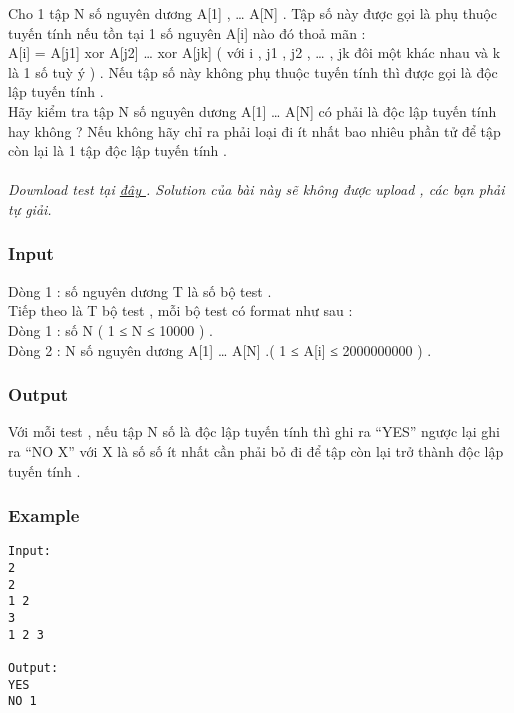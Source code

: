 



   Cho 1 tập N số nguyên dương A[1] , … A[N] . Tập số này được gọi là phụ thuộc tuyến tính nếu tồn tại 1 số nguyên A[i] nào đó thoả mãn :   
\\   A[i] = A[j1] xor A[j2] … xor A[jk] ( với i , j1 , j2 , … , jk  đôi một khác nhau và k là 1 số tuỳ ý ) . Nếu tập số này không phụ thuộc tuyến tính thì được gọi là độc lập tuyến tính .   
\\   Hãy kiểm tra tập N số nguyên dương A[1] … A[N] có phải là độc lập tuyến tính hay không ? Nếu không hãy chỉ ra phải loại đi ít nhất bao nhiêu phần tử để tập còn lại là 1 tập độc lập tuyến tính .   
\\
\\\textit{    Download test tại    \href{http://vn.spoj.pl/content/XOR.rar}{     đây    }    . Solution của bài này sẽ không được upload , các bạn phải tự giải.   }

\subsubsection{   Input  }

   Dòng 1 : số nguyên dương T là số bộ test .   
\\   Tiếp theo là T bộ test , mỗi bộ test có format như sau :   
\\   Dòng 1 : số N ( 1 ≤ N ≤ 10000 ) .   
\\   Dòng 2 : N số nguyên dương A[1] … A[N] .( 1 ≤ A[i] ≤ 2000000000 ) .   
\\

\subsubsection{   Output  }

   Với mỗi test , nếu tập N số là độc lập tuyến tính thì ghi ra “YES” ngược lại ghi ra “NO X” với X là số số ít nhất cần phải bỏ đi để tập còn lại trở thành độc lập tuyến tính .  

\subsubsection{   Example  }
\begin{verbatim}
Input:
2
2
1 2
3
1 2 3

Output:
YES
NO 1
\end{verbatim}